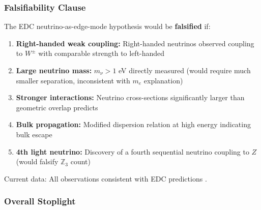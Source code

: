 \subsubsection{Falsifiability Clause}

\begin{tcolorbox}[edcWarning, title={Falsification Criteria}]
The EDC neutrino-as-edge-mode hypothesis would be \textbf{falsified} if:
\begin{enumerate}[nosep]
    \item \textbf{Right-handed weak coupling:} Right-handed neutrinos observed
          coupling to $W^\pm$ with comparable strength to left-handed
    \item \textbf{Large neutrino mass:} $m_\nu > 1$ eV directly measured
          (would require much smaller separation, inconsistent with
          $m_e$ explanation)
    \item \textbf{Stronger interactions:} Neutrino cross-sections significantly
          larger than geometric overlap predicts
    \item \textbf{Bulk propagation:} Modified dispersion relation at high
          energy indicating bulk escape
    \item \textbf{4th light neutrino:} Discovery of a fourth sequential
          neutrino coupling to $Z$ (would falsify $\mathbb{Z}_3$ count)
\end{enumerate}
Current data: All observations consistent with EDC predictions \tagBL{}.
\end{tcolorbox}

\subsubsection{Overall Stoplight}

